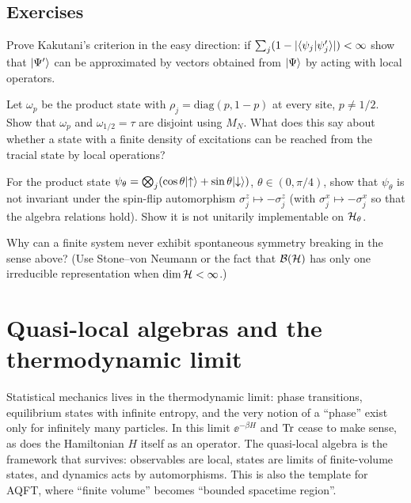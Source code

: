 \subsection*{Exercises}
\begin{exercise}\label{ex:inequiv:1}
Prove Kakutani's criterion in the easy direction: if $\sum_j(1-|\langle \psi_j\vert \psi_j'\rangle|)<\infty$ show that $\lvert \Psi'\rangle$ can be approximated by vectors obtained from $\lvert \Psi\rangle$ by acting with local operators.
\end{exercise}
\begin{exercise}\label{ex:inequiv:2}
Let $\omega_{p}$ be the product state with $\rho_j=\mathrm{diag}(p,1-p)$ at every site, $p\ne1/2$. Show that $\omega_p$ and $\omega_{1/2}=\tau$ are disjoint using $M_N$. What does this say about whether a state with a finite density of excitations can be reached from the tracial state by local operations?
\end{exercise}
\begin{exercise}\label{ex:inequiv:3}
For the product state $\psi_\theta=\bigotimes_j(\cos\theta\lvert \uparrow\rangle+\sin\theta\lvert \downarrow\rangle)$, $\theta\in(0,\pi/4)$, show that $\psi_\theta$ is not invariant under the spin-flip automorphism $\sigma^z_j\mapsto-\sigma^z_j$ (with $\sigma^x_j\mapsto-\sigma^x_j$ so that the algebra relations hold). Show it is not unitarily implementable on $\mathcal{H}_\theta$.
\end{exercise}
\begin{exercise}\label{ex:inequiv:4}
Why can a finite system never exhibit spontaneous symmetry breaking in the sense above? (Use Stone--von Neumann or the fact that $\mathcal{B}(\mathcal{H})$ has only one irreducible representation when $\dim\mathcal{H}<\infty$.)
\end{exercise}

\section{Quasi-local algebras and the thermodynamic limit}\label{ch:quasilocal}

\mshift{17mm}\begin{physmotiv}
Statistical mechanics lives in the thermodynamic limit: phase transitions, equilibrium states with infinite entropy, and the very notion of a ``phase'' exist only for infinitely many particles. In this limit $\ee^{-\beta H}$ and $\operatorname{Tr}$ cease to make sense, as does the Hamiltonian $H$ itself as an operator. The quasi-local algebra is the framework that survives: observables are local, states are limits of finite-volume states, and dynamics acts by automorphisms. This is also the template for AQFT, where ``finite volume'' becomes ``bounded spacetime region''.
\end{physmotiv}

